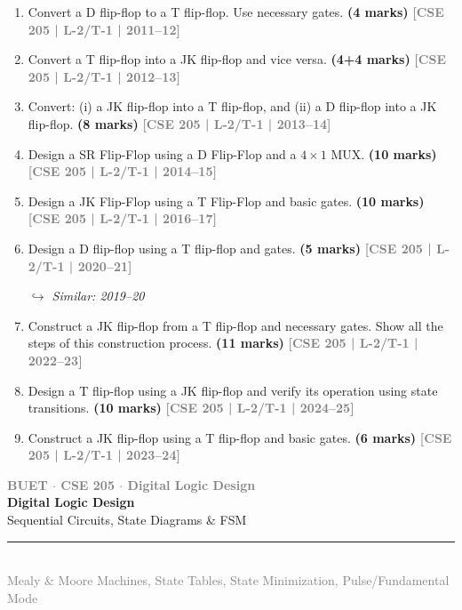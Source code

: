 \documentclass[12pt,a4paper]{article}
\newcommand{\yr}[1]{\hfill\textcolor{gray}{\small\textbf{[#1]}}}
\newcommand{\mk}[1]{\textcolor{orange!70!black}{\small\textbf{(#1 marks)}}}
\newcommand{\variant}[1]{\par\vspace{1pt}\textcolor{blue!50!black}%
  {\footnotesize\textit{$\hookrightarrow$ Similar: #1}}}
\newcommand{\secdivider}[4]{%
  \newpage\thispagestyle{empty}%
  \vspace*{\fill}%
  \begin{tcolorbox}[enhanced,colback=#4!7,colframe=#3,boxrule=1.5pt,arc=8pt,
    left=20pt,right=20pt,top=22pt,bottom=22pt,
    shadow={3pt}{-3pt}{0pt}{black!15}]
    \centering
    {\large\textcolor{gray}{\textbf{BUET $\cdot$ CSE 205 $\cdot$ Digital Logic Design}}}\\[8pt]
    {\fontsize{26}{32}\selectfont\bfseries\textcolor{#3}{Digital Logic Design}}\\[6pt]
    {\fontsize{15}{19}\selectfont\textcolor{dgray}{#1}}\\[12pt]
    \textcolor{#3!60}{\rule{0.5\textwidth}{0.5pt}}\\[6pt]
    {\small\textcolor{gray}{#2}}
  \end{tcolorbox}%
  \vspace*{\fill}\newpage%
}
\begin{document}
\begin{enumerate}

\item Convert a D flip-flop to a T flip-flop. Use necessary gates.
\mk{4} \yr{CSE 205 | L-2/T-1 | 2011--12}

\item Convert a T flip-flop into a JK flip-flop and vice versa.
\mk{4+4} \yr{CSE 205 | L-2/T-1 | 2012--13}

\item Convert: (i) a JK flip-flop into a T flip-flop, and (ii) a D flip-flop into a JK flip-flop.
\mk{8} \yr{CSE 205 | L-2/T-1 | 2013--14}


\item Design a SR Flip-Flop using a D Flip-Flop and a $4\times1$ MUX.
\mk{10} \yr{CSE 205 | L-2/T-1 | 2014--15}


\item Design a JK Flip-Flop using a T Flip-Flop and basic gates.
\mk{10} \yr{CSE 205 | L-2/T-1 | 2016--17}


\item Design a D flip-flop using a T flip-flop and gates.
\mk{5} \yr{CSE 205 | L-2/T-1 | 2020--21}
\variant{2019--20}

\item Construct a JK flip-flop from a T flip-flop and necessary gates. Show all the steps of this construction process.
\mk{11} \yr{CSE 205 | L-2/T-1 | 2022--23}

\item Design a T flip-flop using a JK flip-flop and verify its operation using state transitions.
\mk{10} \yr{CSE 205 | L-2/T-1 | 2024--25}

\item Construct a JK flip-flop using a T flip-flop and basic gates.
\mk{6} \yr{CSE 205 | L-2/T-1 | 2023--24}

\end{enumerate}


\secdivider{Sequential Circuits, State Diagrams \& FSM}{Mealy \& Moore Machines, State Tables, State Minimization, Pulse/Fundamental Mode}{cF}{teal}
\end{document}
